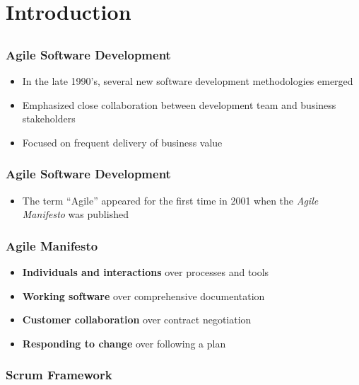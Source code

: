 \section{Introduction}
\subsection{}

\begin{frame}
	\frametitle{Agile Software Development}
	\begin{itemize}
		\setlength\itemsep{0.7em}
		\item In the late 1990’s, several new software development methodologies emerged
		\item Emphasized close collaboration between development team and business stakeholders
		\item Focused on frequent delivery of business value
	\end{itemize}
\end{frame}

\begin{frame}
	\frametitle{Agile Software Development}
	\begin{itemize}
		\item The term ``Agile'' appeared for the first time in 2001 when the \textit{Agile Manifesto} was published
	\end{itemize}
\end{frame}

\begin{frame}
	\frametitle{Agile Manifesto}
	\begin{itemize}
		\setlength\itemsep{0.7em}
		\item \textbf{Individuals and interactions} over processes and tools
		\item \textbf{Working software} over comprehensive documentation
		\item \textbf{Customer collaboration} over contract negotiation
		\item \textbf{Responding to change} over following a plan
	\end{itemize}
\end{frame}

\begin{frame}
	\frametitle{Scrum Framework}
\end{frame}

